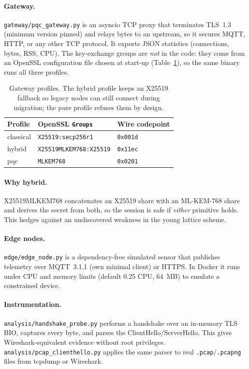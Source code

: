\documentclass[11pt,a4paper]{article}
\begin{document}
\paragraph{Gateway.} \texttt{gateway/pqc\_gateway.py} is an asyncio TCP proxy that terminates
TLS~1.3 (minimum version pinned) and relays bytes to an upstream, so it secures MQTT, HTTP,
or any other TCP protocol. It exports JSON statistics (connections, bytes, RSS, CPU).
The key-exchange groups are \emph{not} in the code: they come from an OpenSSL configuration
file chosen at start-up (Table~\ref{tab:profiles}), so the same binary runs all three profiles.

\begin{table}[H]\centering\small
\begin{tabular}{lll}\toprule
Profile & OpenSSL \texttt{Groups} & Wire codepoint\\\midrule
classical & \texttt{X25519:secp256r1} & \texttt{0x001d}\\
hybrid & \texttt{X25519MLKEM768:X25519} & \texttt{0x11ec}\\
pqc & \texttt{MLKEM768} & \texttt{0x0201}\\\bottomrule
\end{tabular}
\caption{Gateway profiles. The hybrid profile keeps an X25519 fallback so legacy nodes can
still connect during migration; the pure profile refuses them by design.}\label{tab:profiles}
\end{table}

\paragraph{Why hybrid.} X25519MLKEM768 concatenates an X25519 share with an ML-KEM-768
share and derives the secret from both, so the session is safe if \emph{either} primitive
holds. This hedges against an undiscovered weakness in the young lattice scheme.

\paragraph{Edge nodes.} \texttt{edge/edge\_node.py} is a dependency-free simulated sensor that
publishes telemetry over MQTT~3.1.1 (own minimal client) or HTTPS. In Docker it runs under
CPU and memory limits (default 0.25 CPU, 64~MB) to emulate a constrained device.

\paragraph{Instrumentation.} \texttt{analysis/handshake\_probe.py} performs a handshake over
an in-memory TLS BIO, captures every byte, and parses the ClientHello/ServerHello. This
gives Wireshark-equivalent evidence without root privileges. \texttt{analysis/pcap\_clienthello.py}
applies the same parser to real \texttt{.pcap}/\texttt{.pcapng} files from tcpdump or Wireshark.
\end{document}
